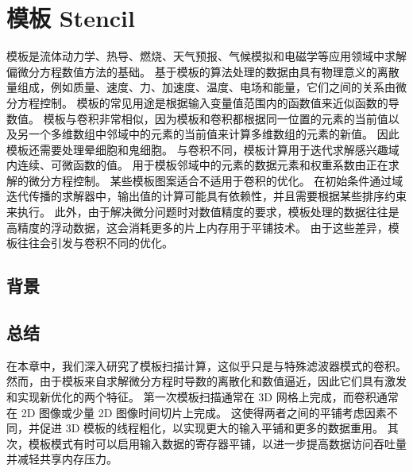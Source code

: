 \section{模板 Stencil}
模板是流体动力学、热导、燃烧、天气预报、气候模拟和电磁学等应用领域中求解偏微分方程数值方法的基础。 基于模板的算法处理的数据由具有物理意义的离散量组成，例如质量、速度、力、加速度、温度、电场和能量，它们之间的关系由微分方程控制。 模板的常见用途是根据输入变量值范围内的函数值来近似函数的导数值。 模板与卷积非常相似，因为模板和卷积都根据同一位置的元素的当前值以及另一个多维数组中邻域中的元素的当前值来计算多维数组的元素的新值。 因此模板还需要处理晕细胞和鬼细胞。 与卷积不同，模板计算用于迭代求解感兴趣域内连续、可微函数的值。 用于模板邻域中的元素的数据元素和权重系数由正在求解的微分方程控制。 某些模板图案适合不适用于卷积的优化。 在初始条件通过域迭代传播的求解器中，输出值的计算可能具有依赖性，并且需要根据某些排序约束来执行。 此外，由于解决微分问题时对数值精度的要求，模板处理的数据往往是高精度的浮动数据，这会消耗更多的片上内存用于平铺技术。 由于这些差异，模板往往会引发与卷积不同的优化。

\subsection{背景}

\subsection{总结}
在本章中，我们深入研究了模板扫描计算，这似乎只是与特殊滤波器模式的卷积。 然而，由于模板来自求解微分方程时导数的离散化和数值逼近，因此它们具有激发和实现新优化的两个特征。 第一次模板扫描通常在 3D 网格上完成，而卷积通常在 2D 图像或少量 2D 图像时间切片上完成。 这使得两者之间的平铺考虑因素不同，并促进 3D 模板的线程粗化，以实现更大的输入平铺和更多的数据重用。 其次，模板模式有时可以启用输入数据的寄存器平铺，以进一步提高数据访问吞吐量并减轻共享内存压力。